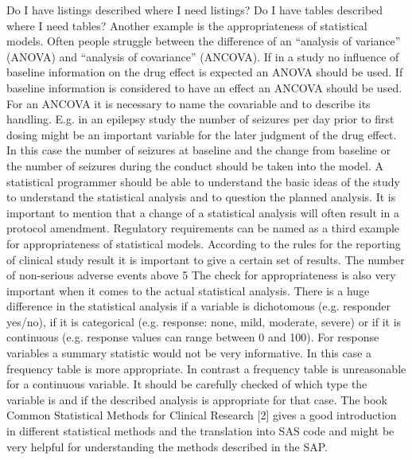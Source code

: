 Do I have listings described where I need listings?
Do I have tables described where I need tables?
Another example is the appropriateness of statistical models. Often people struggle between the difference of an “analysis of variance” (ANOVA) and “analysis of covariance” (ANCOVA). If in a study no influence of baseline information on the drug effect is expected an ANOVA should be used. If baseline information is considered to have an effect an ANCOVA should be used. For an ANCOVA it is necessary to name the covariable and to describe its handling. E.g. in an epilepsy study the number of seizures per day prior to first dosing might be an important variable for the later judgment of the drug effect. In this case the number of seizures at baseline and the change from baseline or the number of seizures during the conduct should be taken into the model. A statistical programmer should be able to understand the basic ideas of the study to understand the statistical analysis and to question the planned analysis. It is important to mention that a change of a statistical analysis will often result in a protocol amendment. Regulatory requirements can be named as a third example for appropriateness of statistical models. According to the rules for the reporting of clinical study result it is important to give a certain set of results. The number of non-serious adverse events above 5%
The check for appropriateness is also very important when it comes to the actual statistical analysis. There is a huge difference in the statistical analysis if a variable is dichotomous (e.g. responder yes/no), if it is categorical (e.g. response: none, mild, moderate, severe) or if it is continuous (e.g. response values can range between 0 and 100). For response variables a summary statistic would not be very informative. In this case a frequency table is more appropriate. In contrast a frequency table is unreasonable for a continuous variable. It should be carefully checked of which type the variable is and if the described analysis is appropriate for that case. The book Common Statistical Methods for Clinical Research [2] gives a good introduction in different statistical methods and the translation into SAS code and might be very helpful for understanding the methods described in the SAP.
